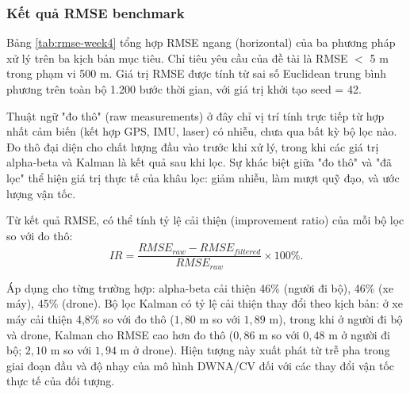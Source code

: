 \subsubsection{Kết quả RMSE benchmark}

\hspace{0.5cm} Bảng \ref{tab:rmse-week4} tổng hợp RMSE ngang (horizontal) của ba phương pháp xử lý trên ba kịch bản mục tiêu. Chỉ tiêu yêu cầu của đề tài là RMSE $<$ 5 m trong phạm vi 500 m. Giá trị RMSE được tính từ sai số Euclidean trung bình phương trên toàn bộ 1.200 bước thời gian, với giá trị khởi tạo seed = 42.

\begin{table}[H]
\centering
\caption{RMSE ngang của ba bộ lọc trên ba kịch bản mục tiêu (seed = 42)}
\label{tab:rmse-week4}
\end{table}

Thuật ngữ "đo thô" (raw measurements) ở đây chỉ vị trí tính trực tiếp từ hợp nhất cảm biến (kết hợp GPS, IMU, laser) có nhiễu, chưa qua bất kỳ bộ lọc nào. Đo thô đại diện cho chất lượng đầu vào trước khi xử lý, trong khi các giá trị alpha-beta và Kalman là kết quả sau khi lọc. Sự khác biệt giữa "đo thô" và "đã lọc" thể hiện giá trị thực tế của khâu lọc: giảm nhiễu, làm mượt quỹ đạo, và ước lượng vận tốc.

Từ kết quả RMSE, có thể tính tỷ lệ cải thiện (improvement ratio) của mỗi bộ lọc so với đo thô:
\begin{equation}
IR = \frac{RMSE_{raw} - RMSE_{filtered}}{RMSE_{raw}} \times 100\%.
\end{equation}

Áp dụng cho từng trường hợp: alpha-beta cải thiện 46\% (người đi bộ), 46\% (xe máy), 45\% (drone). Bộ lọc Kalman có tỷ lệ cải thiện thay đổi theo kịch bản: ở xe máy cải thiện 4{,}8\% so với đo thô ($1{,}80$ m so với $1{,}89$ m), trong khi ở người đi bộ và drone, Kalman cho RMSE cao hơn đo thô ($0{,}86$ m so với $0{,}48$ m ở người đi bộ; $2{,}10$ m so với $1{,}94$ m ở drone). Hiện tượng này xuất phát từ trễ pha trong giai đoạn đầu và độ nhạy của mô hình DWNA/CV đối với các thay đổi vận tốc thực tế của đối tượng.

